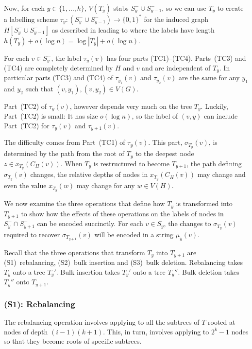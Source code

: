 \documentclass[kpfonts]{patmorin}
\begin{document}
Now, for each $y\in\{1,\ldots,h\}$, $V(T_y)$ stabs $S^-_y\cup S^-_{y-1}$, so we can use $T_y$ to create a labelling scheme $\tau_y:(S^-_y\cup S^-_{y-1})\to\{0,1\}^*$ for the induced graph $H[S^-_y\cup S^-_{y-1}]$ as described in  leading to  where the labels have length $h(T_y) + o(\log n)=\log|T_y|+o(\log n)$.  

For each $v\in S^-_y$, the label $\tau_y(v)$ has four parts (TC1)--(TC4).  Parts~(TC3) and (TC4) are completely determined by $H$ and $v$ and are independent of $T_y$.  In particular parts (TC3) and (TC4) of $\tau_{y_1}(v)$ and $\tau_{y_2}(v)$ are the same for any $y_1$ and $y_2$ such that $(v,y_1),(v,y_2)\in V(G)$.  

Part~(TC2) of $\tau_y(v)$, however depends very much on the tree $T_y$.  Luckily, Part~(TC2) is small: It has size $o(\log n)$, so the label of $(v,y)$ can include Part~(TC2) for $\tau_{y}(v)$ and $\tau_{y+1}(v)$.

The difficulty comes from Part~(TC1) of $\tau_y(v)$.  This part, $\sigma_{T_y}(v)$, is determined by the path from the root of $T_y$ to the deepest node $z\in x_{T_y}(C_H(v))$.  When $T_y$ is restructured to become $T_{y+1}$, the path defining $\sigma_{T_y}(v)$ changes, the relative depths of nodes in $x_{T_y}(C_H(v))$ may change and even the value $x_{T_y}(w)$ may change for any $w\in V(H)$.  

We now examine the three operations that define how $T_y$ is transformed into $T_{y+1}$ to show how the effects of these operations on the labels of nodes in $S^-_y\cap S^-_{y+1}$ can be encoded succinctly.  For each $v\in S_y$, the changes to $\sigma_{T_y}(v)$ required to recover $\sigma_{T_{y+1}}(v)$ will be encoded in a string $\mu_y(v)$.

Recall that the three operations that transform $T_y$ into $T_{y+1}$ are (S1)~rebalancing, (S2)~bulk insertion and (S3)~bulk deletion. Rebalancing takes $T_y$ onto a tree $T_y'$. Bulk insertion takes $T_y'$ onto a tree $T_y''$.  Bulk deletion takes $T_y''$ onto $T_{y+1}$.


\subsubsection{(S1): Rebalancing}

The rebalancing operation involves applying  to all the subtrees of $T$ rooted at nodes of depth $(i-1)(k+1)$.  This, in turn, involves applying  to $2^k-1$ nodes so that they become roots of specific subtrees.
\end{document}
